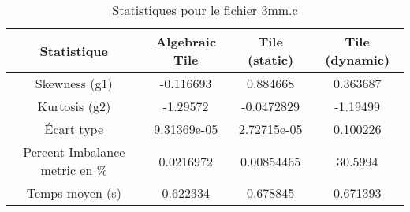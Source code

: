 \documentclass{article}
\begin{document}
\begin{table}[htbp]
  \centering
  \caption{Statistiques pour le fichier 3mm.c}
  \begin{tabular}{|c|c|c|c|}
    \hline
    Statistique & Algebraic Tile & Tile (static) & Tile (dynamic) \\ 
    \hline
    Skewness (g1) & -0.116693 & 0.884668 & 0.363687 \\ 
    Kurtosis (g2) & -1.29572 & -0.0472829 & -1.19499 \\ 
    Écart type & 9.31369e-05 & 2.72715e-05 & 0.100226\\ 
    Percent Imbalance metric en \% & 0.0216972 & 0.00854465 & 30.5994\\ 
    Temps moyen (s) & 0.622334 & 0.678845 & 0.671393 \\ 
    \hline
  \end{tabular}
\end{table}
\newpage

  
\end{document}
